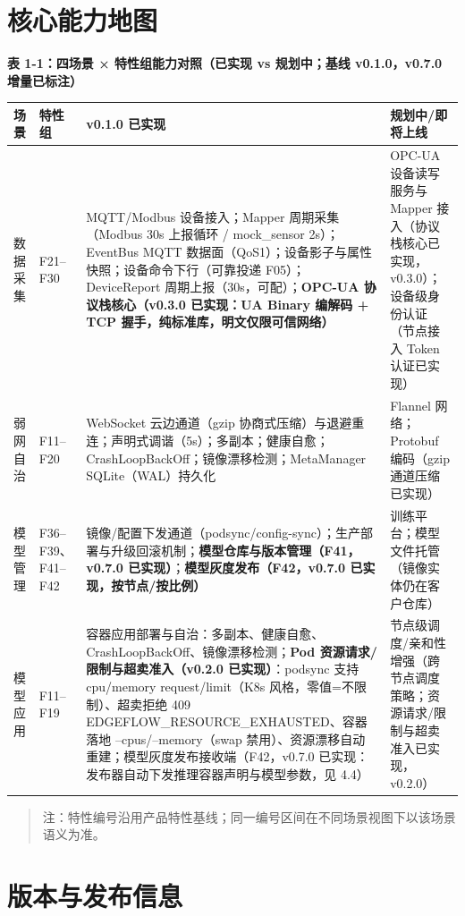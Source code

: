 \section{核心能力地图}

\textbf{表 1-1：四场景 × 特性组能力对照（已实现 vs 规划中；基线 v0.1.0，v0.7.0 增量已标注）}

{\small\setlength{\tabcolsep}{3pt}
\begin{tabular}{@{}p{1.3cm}p{1.3cm}p{6.4cm}p{6.0cm}@{}}
\toprule
场景 & 特性组 & v0.1.0 已实现 & 规划中/即将上线\\
\midrule
数据采集 & F21--F30 & MQTT/Modbus 设备接入；Mapper 周期采集（Modbus 30s 上报循环 / mock\_sensor 2s）；EventBus MQTT 数据面（QoS1）；设备影子与属性快照；设备命令下行（可靠投递 F05）；DeviceReport 周期上报（30s，可配）；\textbf{OPC-UA 协议栈核心（v0.3.0 已实现：UA Binary 编解码 + TCP 握手，纯标准库，明文仅限可信网络）} & OPC-UA 设备读写服务与 Mapper 接入（协议栈核心已实现，v0.3.0）；设备级身份认证（节点接入 Token 认证已实现）\\
\addlinespace[3pt]
弱网自治 & F11--F20 & WebSocket 云边通道（gzip 协商式压缩）与退避重连；声明式调谐（5s）；多副本；健康自愈；CrashLoopBackOff；镜像漂移检测；MetaManager SQLite（WAL）持久化 & Flannel 网络；Protobuf 编码（gzip 通道压缩已实现）\\
\addlinespace[3pt]
模型管理 & F36--F39、F41--F42 & 镜像/配置下发通道（podsync/config-sync）；生产部署与升级回滚机制；\textbf{模型仓库与版本管理（F41，v0.7.0 已实现）}；\textbf{模型灰度发布（F42，v0.7.0 已实现，按节点/按比例）} & 训练平台；模型文件托管（镜像实体仍在客户仓库）\\
\addlinespace[3pt]
模型应用 & F11--F19 & 容器应用部署与自治：多副本、健康自愈、CrashLoopBackOff、镜像漂移检测；\textbf{Pod 资源请求/限制与超卖准入（v0.2.0 已实现）}：podsync 支持 cpu/memory request/limit（K8s 风格，零值=不限制）、超卖拒绝 409 EDGEFLOW\_RESOURCE\_EXHAUSTED、容器落地 --cpus/--memory（swap 禁用）、资源漂移自动重建；模型灰度发布接收端（F42，v0.7.0 已实现：发布器自动下发推理容器声明与模型参数，见 4.4） & 节点级调度/亲和性增强（跨节点调度策略；资源请求/限制与超卖准入已实现，v0.2.0）\\
\bottomrule
\end{tabular}}

\begin{quote}
注：特性编号沿用产品特性基线；同一编号区间在不同场景视图下以该场景语义为准。
\end{quote}

\section{版本与发布信息}

